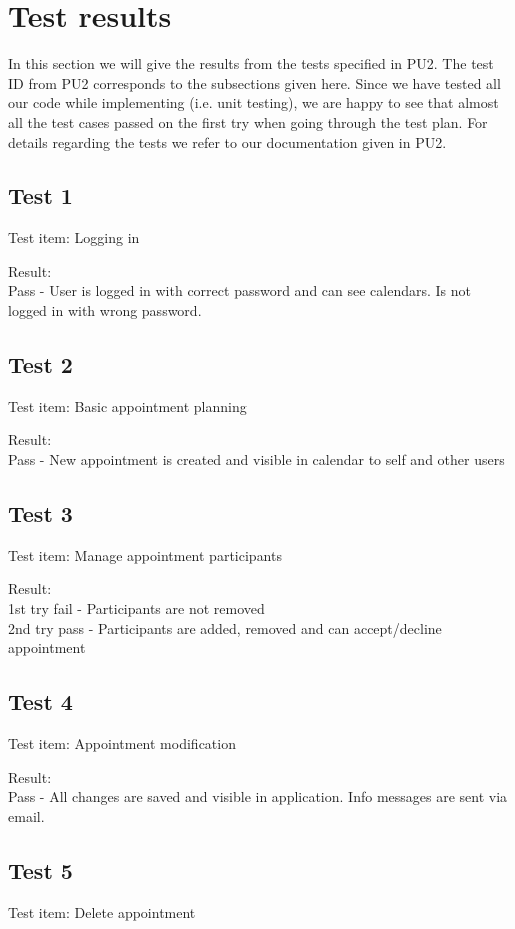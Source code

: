 \section{Test results}
In this section we will give the results from the tests specified in PU2. The test ID from PU2 corresponds to the subsections given here. Since we have tested all our code while implementing (i.e. unit testing), we are happy to see that almost all the test cases passed on the first try when going through the test plan. For details regarding the tests we refer to our documentation given in PU2.
\subsection{Test 1}
Test item: Logging in

Result: \\Pass - User is logged in with correct password and can see calendars. Is not logged in with wrong password.

\subsection{Test 2}
Test item: Basic appointment planning

Result: \\Pass - New appointment is created and visible in calendar to self and other users

\subsection{Test 3}
Test item: Manage appointment participants

Result: \\1st try fail - Participants are not removed\\
2nd try pass - Participants are added, removed and can accept/decline appointment\\

\subsection{Test 4}
Test item: Appointment modification

Result: \\Pass - All changes are saved and visible in application. Info messages are sent via email.

\subsection{Test 5}
Test item: Delete appointment

